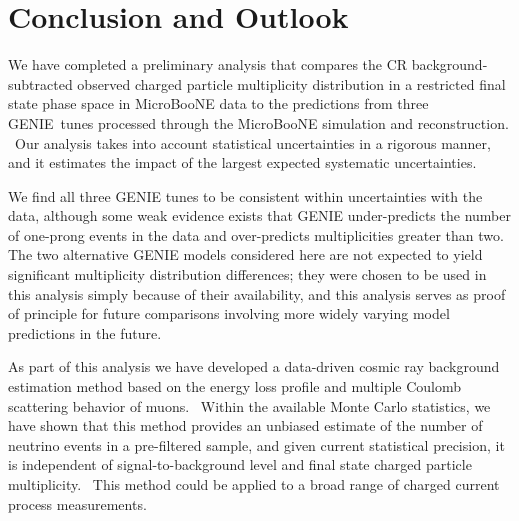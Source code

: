 \documentclass{article}
\begin{document}
\iffalse
\begin{figure}[h]
\begin{minipage}{.5\textwidth}
\centering
\texttt{[image: mult\_data\_MC\_mec\_tem1]}
\end{minipage}
\begin{minipage}{.5\textwidth}
\centering
\texttt{[image: mult\_data\_MC\_mec\_tem\_logy1]}
\end{minipage}
\caption{An overlaid, bin-by-bin fitted, area normalized, CR
background-subtracted, observed neutrino multiplicity distributions for
MicroBooNE\ data and three GENIE predictions in linear scale
(left) and in log y scale (right). Data error bars include statistical errors
obtained from the fit. Monte Carlo error bands include MC statistical errors from the
fit and systematic error contributions added in quadrature.}
\label{img:final_mult_dist}
\end{figure}
\fi

\section{Conclusion and Outlook}

We have completed a preliminary analysis that compares the CR background-subtracted observed charged particle multiplicity distribution in a restricted final state phase space in MicroBooNE data to the
predictions from three GENIE\ tunes processed through the MicroBooNE
simulation and reconstruction. \ Our analysis takes into account statistical
uncertainties in a rigorous manner, and it estimates the impact of the
largest expected systematic uncertainties.

We find all three GENIE tunes to be consistent within uncertainties with the
data, although some weak evidence exists that GENIE under-predicts the
number of one-prong events in the data and over-predicts multiplicities
greater than two. The two alternative GENIE models considered here are not expected to yield significant multiplicity distribution differences; they were chosen to be used in this analysis simply because of their availability, and this analysis serves as proof of principle for future comparisons involving more widely varying model predictions in the future.

As part of this analysis we have developed a data-driven cosmic ray
background estimation method based on the energy loss profile and
multiple Coulomb scattering behavior of muons. \ Within the available Monte
Carlo statistics, we have shown that this method provides an unbiased
estimate of the number of neutrino events in a pre-filtered sample, and
given current statistical precision, it is independent of
signal-to-background level and final state charged particle multiplicity. \
This method could be applied to a broad range of charged current process measurements.
\end{document}
